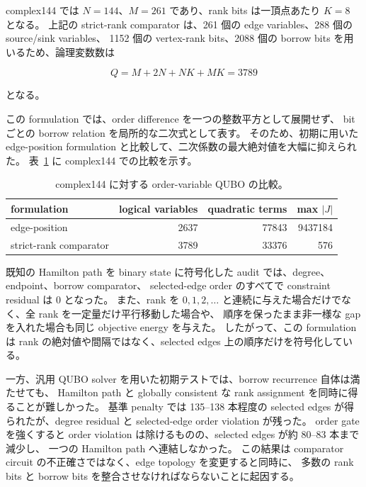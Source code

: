 complex144 では $N=144$、$M=261$ であり、rank bits は一頂点あたり $K=8$ となる。
上記の strict-rank comparator は、261 個の edge variables、288 個の source/sink variables、
1152 個の vertex-rank bits、2088 個の borrow bits を用いるため、論理変数数は

\begin{equation}
Q
=M+2N+NK+MK
=3789
\label{eq:strict_rank_variable_count}
\end{equation}

となる。

この formulation では、order difference を一つの整数平方として展開せず、
bit ごとの borrow relation を局所的な二次式として表す。
そのため、初期に用いた edge-position formulation と比較して、二次係数の最大絶対値を大幅に抑えられた。
表~\ref{tab:order_qubo_comparison} に complex144 での比較を示す。

\begin{table}[tbp]
\centering
\caption{complex144 に対する order-variable QUBO の比較。}
\label{tab:order_qubo_comparison}
\begin{tabular}{lrrr}
\hline
formulation & logical variables & quadratic terms & max $|J|$ \\
\hline
edge-position & 2637 & 77843 & 9437184 \\
strict-rank comparator & 3789 & 33376 & 576 \\
\hline
\end{tabular}
\end{table}

既知の Hamilton path を binary state に符号化した audit では、degree、endpoint、borrow comparator、
selected-edge order のすべてで constraint residual は 0 となった。
また、rank を $0,1,2,\ldots$ と連続に与えた場合だけでなく、全 rank を一定量だけ平行移動した場合や、
順序を保ったまま非一様な gap を入れた場合も同じ objective energy を与えた。
したがって、この formulation は rank の絶対値や間隔ではなく、selected edges 上の順序だけを符号化している。

一方、汎用 QUBO solver を用いた初期テストでは、borrow recurrence 自体は満たせても、
Hamilton path と globally consistent な rank assignment を同時に得ることが難しかった。
基準 penalty では 135--138 本程度の selected edges が得られたが、degree residual と selected-edge order violation が残った。
order gate を強くすると order violation は除けるものの、selected edges が約 80--83 本まで減少し、
一つの Hamilton path へ連結しなかった。
この結果は comparator circuit の不正確さではなく、edge topology を変更すると同時に、
多数の rank bits と borrow bits を整合させなければならないことに起因する。

